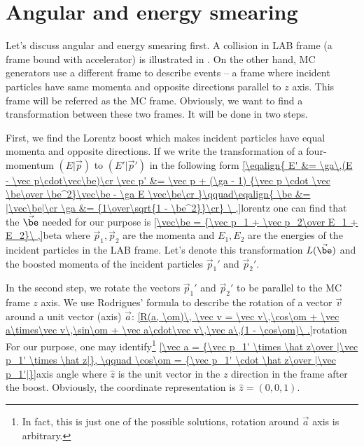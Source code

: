 \iffalse

\section{Conventions}

Proton 1 goes from lower $z$ to higher $z$. Angles are measured from beam axis in CCW direction, i.e. $\al_1$ is negative and $\al_2$ is positive in the Figure 1.

\fig[10cm]{fig/fig1d.eps}{crossing angle}{Sketch of energy/angular smearing.}
\fi

\section{Angular and energy smearing}

Let's discuss angular and energy smearing first. A collision in LAB frame (a frame bound with accelerator) is illustrated in . On the other hand, MC generators use a different frame to describe events -- a frame where incident particles have same momenta and opposite directions parallel to $z$ axis. This frame will be referred as the MC frame. Obviously, we want to find a transformation between these two frames. It will be done in two steps. 


\vfil\eject
First, we find the Lorentz boost which makes incident particles have equal momenta and opposite directions. If we write the transformation of a four-momentum $(E|\vec p)$ to $(E'|\vec p')$ in the following form
\eqref{\eqalign{
E'      &= \ga\,(E - \vec p\cdot\vec\be)\cr
\vec p' &= \vec p  +  (\ga - 1) {\vec p \cdot \vec \be\over \be^2}\vec\be - \ga E \vec\be\cr
}\qquad\eqalign{
\be &= |\vec\be|\cr
\ga &= {1\over\sqrt{1 - \be^2}}\cr}
\ ,}{lorentz}
one can find that the $\vec\be$ needed for our purpose is
\eqref{\vec\be = {\vec p_1 + \vec p_2\over E_1 + E_2}\ ,}{beta}
where $\vec p_1, \vec p_2$ are the momenta and $E_1, E_2$ are the energies of the incident particles in the LAB frame. Let's denote this transformation $L(\vec\be)$ and the boosted momenta of the incident particles $\vec p_1'$ and $\vec p_2'$.

In the second step, we rotate the vectors $\vec p_1'$ and $\vec p_2'$ to be parallel to the MC frame $z$ axis. We use Rodrigues' formula to describe the rotation of a vector $\vec v$ around a unit vector (axis) $\vec a$:
\eqref{R(a, \om)\, \vec v = \vec v\,\cos\om + \vec a\times\vec v\,\sin\om + \vec a\cdot\vec v\,\vec a\,(1 - \cos\om)\ .}{rotation}
For our purpose, one may identify\footnote{In fact, this is just one of the possible solutions, rotation around $\vec a$ axis is arbitrary.}
\eqref{\vec a = {\vec p_1' \times \hat z\over |\vec p_1' \times \hat z|}, \qquad \cos\om = {\vec p_1' \cdot \hat z\over |\vec p_1'|}}{axis angle}
where $\hat z$ is the unit vector in the $z$ direction in the frame after the boost. Obviously, the coordinate representation is $\hat z = (0, 0, 1)$.

